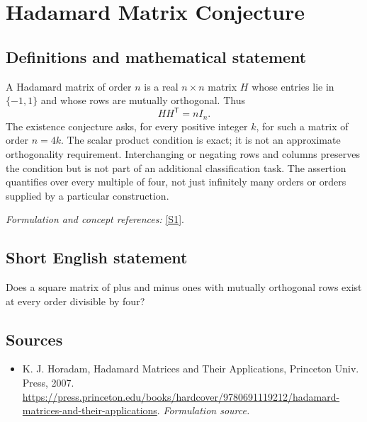 \documentclass[11pt]{article}
\begin{document}
\section*{\texorpdfstring{Hadamard Matrix Conjecture}{Hadamard Matrix Conjecture}}\label{1454}
\subsection{Definitions and mathematical statement}
A Hadamard matrix of order $n$ is a real $n\times n$ matrix $H$ whose entries lie in $\{-1,1\}$ and whose rows are mutually orthogonal. Thus
\[
 HH^{\mathsf T}=nI_n.
\]
The existence conjecture asks, for every positive integer $k$, for such a matrix of order $n=4k$. The scalar product condition is exact; it is not an approximate orthogonality requirement. Interchanging or negating rows and columns preserves the condition but is not part of an additional classification task. The assertion quantifies over every multiple of four, not just infinitely many orders or orders supplied by a particular construction.
\par\smallskip\textit{Formulation and concept references:} \href{https://press.princeton.edu/books/hardcover/9780691119212/hadamard-matrices-and-their-applications}{[S1]}.

\subsection{Short English statement}
Does a square matrix of plus and minus ones with mutually orthogonal rows exist at every order divisible by four?
\subsection{Sources}
\begin{itemize}
\item[S1]K. J. Horadam, Hadamard Matrices and Their Applications, Princeton Univ. Press, 2007.
\url{https://press.princeton.edu/books/hardcover/9780691119212/hadamard-matrices-and-their-applications}.
\textit{Formulation source.}
\end{itemize}
\end{document}
